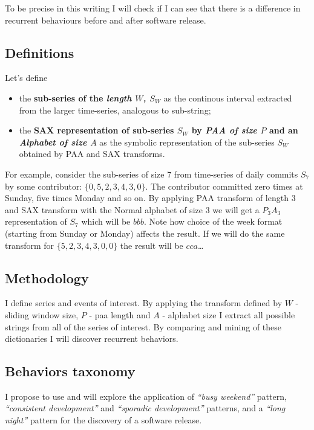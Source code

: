 \documentclass[a4paper,10pt]{article}
\numberwithin{equation}{subsection}
\begin{document}
To be precise in this writing I will check if I can see that there is a difference in recurrent behaviours before and after 
software release.

\subsection{Definitions}
Let's define 
\begin{itemize}
 \item the \textbf{sub-series of the \textit{length $W$, $S_{W}$}} as the 
    continous interval extracted from the larger time-series, analogous to sub-string;
 \item the \textbf{SAX representation of sub-series $S_{W}$ by \textit{PAA of size $P$} and 
    an \textit{Alphabet of size $A$}} as the symbolic representation of the 
    sub-series $S_{W}$ obtained by PAA and SAX transforms.
\end{itemize}

For example, consider the sub-series of size 7 from time-series of daily commits $S_{7}$ by some contributor: $\{0,5,2,3,4,3,0\}$.
The contributor committed zero times at Sunday, five times Monday and so on. By applying PAA transform of length $3$ and SAX 
transform with the Normal alphabet of size $3$ we will get a $P_{3}A_{3}$ representation of $S_{7}$ which will be $bbb$. 
Note how choice of the week format (starting from Sunday or Monday) affects the result. If we will do the same transform for 
$\{5,2,3,4,3,0,0\}$ the result will be $cca$\ldots

\subsection{Methodology}
I define series and events of interest. 
By applying the transform defined by $W$ - sliding window size, $P$ - paa length and $A$ - alphabet size I extract all possible
strings from all of the series of interest. 
By comparing and mining of these dictionaries I will discover recurrent behaviors.

\subsection{Behaviors taxonomy}
I propose to use and will explore the application of \textit{``busy weekend''} pattern,
\textit{``consistent development''} and \textit{``sporadic development''} patterns, 
and a \textit{``long night''} pattern for the discovery of a software release. 
\end{document}
